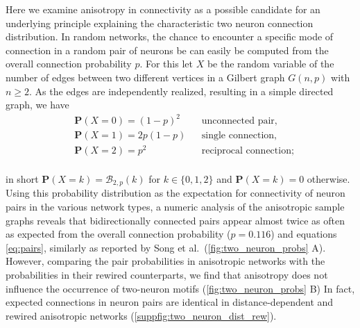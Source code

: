 Here we examine anisotropy in connectivity as a possible candidate for
an underlying principle explaining the characteristic two neuron
connection distribution. In random networks, the chance to encounter a
specific mode of connection in a random pair of neurons be can easily
be computed from the overall connection probability $p$. For this let
$X$ be the random variable of the number of edges between two
different vertices in a Gilbert graph $G(n,p)$ with $n \ge 2$. As the
edges are independently realized, resulting in a simple directed
graph, we have
\vspace{0.1cm}
\begin{equation}
  \label{eq:pairs}
  \begin{aligned}%
    & \mathbf{P}(X=0) = (1-p)^2    &&\text{unconnected pair,}  \\
    & \mathbf{P}(X=1) = 2p(1-p)    &&\text{single connection,}\\
    & \mathbf{P}(X=2) = p^2        &&\text{reciprocal connection};
  \end{aligned}%
\end{equation}
\vspace{0.1cm} \\
in short $\mathbf{P}(X=k) = \mathcal{B}_{2,p}(k)$ for $k \in
\{0,1,2\}$ and $\mathbf{P}(X=k) = 0$ otherwise. Using this probability
distribution as the expectation for connectivity of neuron pairs in
the various network types, a numeric analysis of the anisotropic
sample graphs reveals that bidirectionally connected pairs appear
almost twice as often as expected from the overall connection
probability ($p=0.116$) and equations \ref{eq:pairs}, similarly as
reported by Song et al.~(\autoref{fig:two_neuron_probs} A). However,
comparing the pair probabilities in anisotropic networks with the
probabilities in their rewired counterparts, we find that anisotropy
does not influence the occurrence of two-neuron motifs
(\autoref{fig:two_neuron_probs} B) In fact, expected connections in
neuron pairs are identical in distance-dependent and rewired
anisotropic networks (\autoref{suppfig:two_neuron_dist_rew}).

